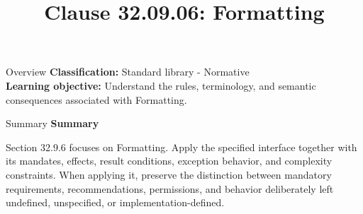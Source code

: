 \documentclass[10pt,letterpaper]{article}
\title{Clause 32.09.06: Formatting}
\author{}
\date{}
\begin{document}
\maketitle
\begin{CornellOverviewBox}{Overview}
\textbf{Classification:} Standard library - Normative\\[2pt]
\textbf{Learning objective:} Understand the rules, terminology, and semantic consequences associated with Formatting.
\end{CornellOverviewBox}\begin{CornellSummaryBox}{Summary}
{\sffamily\bfseries\color{Accent} Summary}\par\vspace{3pt}Section 32.9.6 focuses on Formatting. Apply the specified interface together with its mandates, effects, result conditions, exception behavior, and complexity constraints. When applying it, preserve the distinction between mandatory requirements, recommendations, permissions, and behavior deliberately left undefined, unspecified, or implementation-defined.
\end{CornellSummaryBox}
\end{document}
